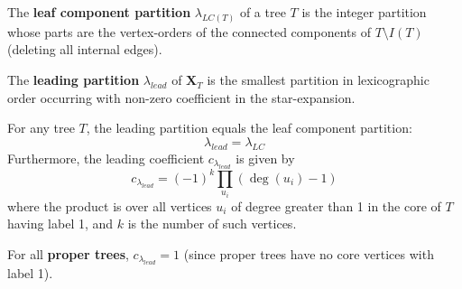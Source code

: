 \documentclass[12pt]{memoir}
\begin{document}
\begin{ptcb}
\begin{Def}
The \textbf{leaf component partition} $\lambda_{LC(T)}$ of a tree $T$ is the integer partition whose parts are the vertex-orders of the connected components of $T \setminus I(T)$ (deleting all internal edges).

The \textbf{leading partition} $\lambda_{lead}$ of $\mathbf{X}_T$ is the smallest partition in lexicographic order occurring with non-zero coefficient in the star-expansion.
\end{Def}
\end{ptcb}

\begin{ptcb}
\begin{Th}
For any tree $T$, the leading partition equals the leaf component partition:
\[
\lambda_{lead} = \lambda_{LC}
\]
Furthermore, the leading coefficient $c_{\lambda_{lead}}$ is given by
\[
c_{\lambda_{lead}} = (-1)^k \prod_{u_i} (\deg(u_i) - 1)
\]
where the product is over all vertices $u_i$ of degree greater than 1 in the core of $T$ having label 1, and $k$ is the number of such vertices.
\end{Th}
\end{ptcb}

\begin{Cor}
For all \textbf{proper trees}, $c_{\lambda_{lead}} = 1$ (since proper trees have no core vertices with label 1).
\end{Cor}
\end{document}
